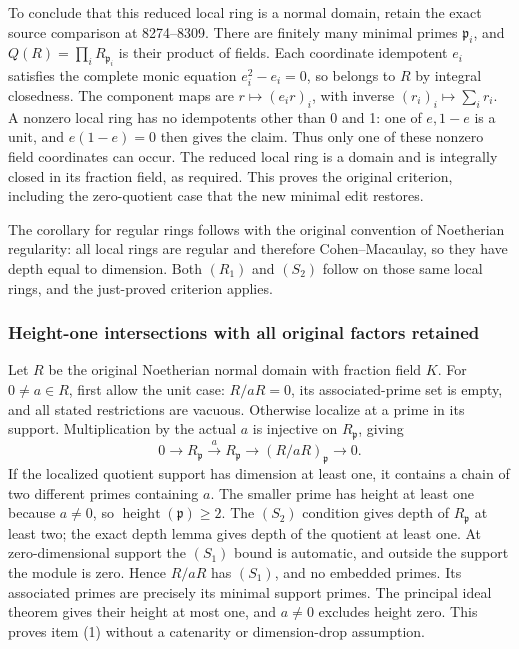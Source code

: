 To conclude that this reduced local ring is a normal domain, retain the exact source comparison at 8274--8309. There are finitely many minimal primes \(\mathfrak p_i\), and \(Q(R)=\prod_iR_{\mathfrak p_i}\) is their product of fields. Each coordinate idempotent \(e_i\) satisfies the complete monic equation \(e_i^2-e_i=0\), so belongs to \(R\) by integral closedness. The component maps are \(r\mapsto(e_ir)_i\), with inverse \((r_i)_i\mapsto\sum_i r_i\). A nonzero local ring has no idempotents other than 0 and 1: one of \(e,1-e\) is a unit, and \(e(1-e)=0\) then gives the claim. Thus only one of these nonzero field coordinates can occur. The reduced local ring is a domain and is integrally closed in its fraction field, as required. This proves the original criterion, including the zero-quotient case that the new minimal edit restores.

The corollary for regular rings follows with the original convention of Noetherian regularity: all local rings are regular and therefore Cohen--Macaulay, so they have depth equal to dimension. Both \((R_1)\) and \((S_2)\) follow on those same local rings, and the just-proved criterion applies.

\subsubsection{Height-one intersections with all original factors retained}\label{algebra-proof-062-height-one-intersections-with-all-original-factors-retained}

Let \(R\) be the original Noetherian normal domain with fraction field \(K\). For \(0\ne a\in R\), first allow the unit case: \(R/aR=0\), its associated-prime set is empty, and all stated restrictions are vacuous. Otherwise localize at a prime in its support. Multiplication by the actual \(a\) is injective on \(R_{\mathfrak p}\), giving \[
 0\longrightarrow R_{\mathfrak p}\xrightarrow{\ a\ }R_{\mathfrak p}
 \longrightarrow (R/aR)_{\mathfrak p}\longrightarrow0.
\] If the localized quotient support has dimension at least one, it contains a chain of two different primes containing \(a\). The smaller prime has height at least one because \(a\ne0\), so \(\operatorname{height}(\mathfrak p)\geq2\). The \((S_2)\) condition gives depth of \(R_{\mathfrak p}\) at least two; the exact depth lemma gives depth of the quotient at least one. At zero-dimensional support the \((S_1)\) bound is automatic, and outside the support the module is zero. Hence \(R/aR\) has \((S_1)\), and no embedded primes. Its associated primes are precisely its minimal support primes. The principal ideal theorem gives their height at most one, and \(a\ne0\) excludes height zero. This proves item (1) without a catenarity or dimension-drop assumption.

